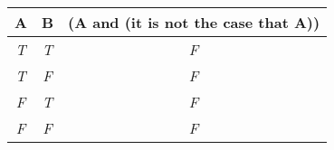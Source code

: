 

\begin{center}
\begin{tabular}{c c||c}
 A  & B & (A and  (it is not the case that A))\\
\hline
\emph{T} & \emph{T} & \emph{F} \\
\emph{T} & \emph{F} & \emph{F}  \\
\emph{F} & \emph{T} & \emph{F} \\
\emph{F} & \emph{F} & \emph{F} \\
\end{tabular}
\end{center}

